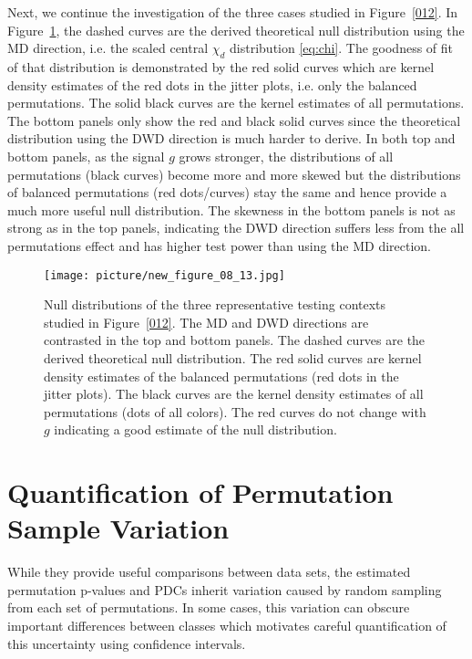 \documentclass[12pt]{article}
\begin{document}
Next, we continue the investigation of the three cases studied in Figure~\ref{012}. In Figure~\ref{3_densities}, the dashed curves are the derived theoretical null distribution using the MD direction, i.e. the scaled central $\chi_d$ distribution \eqref{eq:chi}. The goodness of fit of that distribution is demonstrated by the red solid curves which are kernel density estimates of the red dots in the jitter plots, i.e. only the balanced permutations. The solid black curves are the kernel estimates of all permutations. The bottom panels only show the red and black solid curves since the theoretical distribution using the DWD direction is much harder to derive. In both top and bottom panels, as the signal $g$ grows stronger, the distributions of all permutations (black curves) become more and more skewed but the distributions of balanced permutations (red dots/curves) stay the same and hence provide a much more useful null distribution. The skewness in the bottom panels is not as strong as in the top panels, indicating the DWD direction suffers less from the all permutations effect and has higher test power than using the MD direction. 
\begin{figure}[H]
  \centering
  \texttt{[image: picture/new\_figure\_08\_13.jpg]}\\
    \caption{Null distributions of the three representative testing contexts studied in Figure~\ref{012}. The MD and DWD directions are contrasted in the top and bottom panels. The dashed curves are the derived theoretical null distribution. The red solid curves are kernel density estimates of the balanced permutations (red dots in the jitter plots).  The black curves are the kernel density estimates of all permutations (dots of all colors). The red curves do not change with $g$ indicating a good estimate of the null distribution.}
    \label{3_densities}
\end{figure}


\section{Quantification of Permutation Sample Variation}\label{ci:all}
While they provide useful comparisons between data sets, the estimated permutation p-values and PDCs inherit variation caused by random sampling from each set of permutations. In some cases, this variation can obscure important differences between classes which motivates careful quantification of this uncertainty using confidence intervals.
\end{document}

